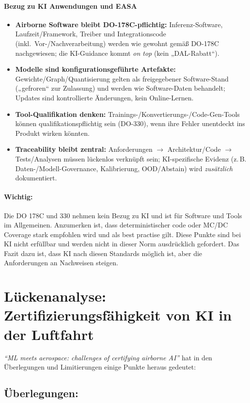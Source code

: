 \paragraph{Bezug zu KI Anwendungen und EASA}
\begin{itemize}
  \item \textbf{Airborne Software bleibt DO-178C-pflichtig:} Inferenz-Software, Laufzeit/Framework, Treiber und Integrationscode (inkl.\ Vor-/Nachverarbeitung) werden wie gewohnt gemäß DO-178C nachgewiesen; die KI-Guidance kommt \emph{on top} (kein „DAL-Rabatt“).
  \item \textbf{Modelle sind konfigurationsgeführte Artefakte:} Gewichte/Graph/Quantisierung gelten als freigegebener Software-Stand („gefroren“ zur Zulassung) und werden wie Software-Daten behandelt; Updates sind kontrollierte Änderungen, kein Online-Lernen.
  \item \textbf{Tool-Qualifikation denken:} Trainings-/Konvertierungs-/Code-Gen-Tools können qualifikationspflichtig sein (DO-330), wenn ihre Fehler unentdeckt ins Produkt wirken könnten.
  \item \textbf{Traceability bleibt zentral:} Anforderungen \(\rightarrow\) Architektur/Code \(\rightarrow\) Tests/Analysen müssen lückenlos verknüpft sein; KI-spezifische Evidenz (z.\,B. Daten-/Modell-Governance, Kalibrierung, OOD/Abstain) wird \emph{zusätzlich} dokumentiert.
\end{itemize}
\paragraph{Wichtig:}
Die DO 178C und 330 nehmen kein Bezug zu KI und ist für Software und Tools im Allgemeinen. Anzumerken ist, dass deterministischer code 
oder MC/DC Coverage stark empfohlen wird und als best practise gilt. Diese Punkte sind bei KI nicht erfüllbar und werden nicht in dieser 
Norm ausdrücklich gefordert. Das Fazit dazu ist, dass KI nach diesen Standards möglich ist, aber die Anforderungen an Nachweisen steigen.






\section{Lückenanalyse: Zertifizierungsfähigkeit von KI in der Luftfahrt}
\textit{``ML meets aerospace: challenges of certifying airborne AI''} hat in den Überlegungen und Limitierungen einige Punkte heraus gedeutet:
\subsection{Überlegungen:}
